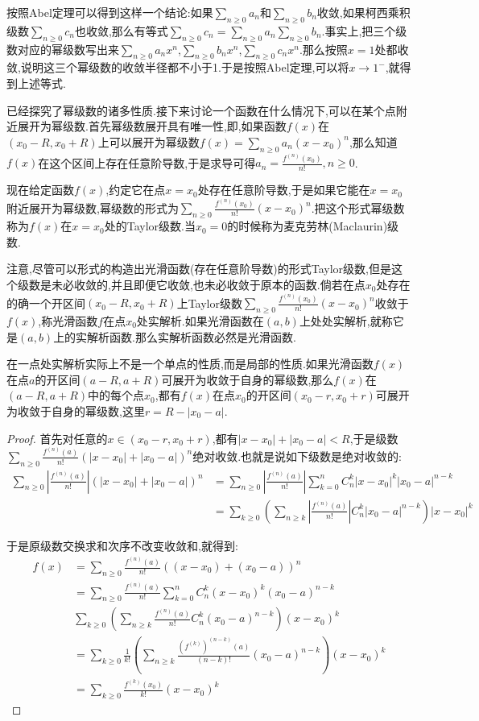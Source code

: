按照Abel定理可以得到这样一个结论:如果$\sum_{n\ge0}a_n$和$\sum_{n\ge0}b_n$收敛,如果柯西乘积级数$\sum_{n\ge0}c_n$也收敛,那么有等式$\sum_{n\ge0}c_n=\sum_{n\ge0}a_n\sum_{n\ge0}b_n$.事实上,把三个级数对应的幂级数写出来$\sum_{n\ge0}a_nx^n$,$\sum_{n\ge0}b_nx^n$,$\sum_{n\ge0}c_nx^n$.那么按照$x=1$处都收敛,说明这三个幂级数的收敛半径都不小于1.于是按照Abel定理,可以将$x\to1^-$,就得到上述等式.

已经探究了幂级数的诸多性质.接下来讨论一个函数在什么情况下,可以在某个点附近展开为幂级数.首先幂级数展开具有唯一性,即,如果函数$f(x)$在$(x_0-R,x_0+R)$上可以展开为幂级数$f(x)=\sum_{n\ge0}a_n(x-x_0)^n$,那么知道$f(x)$在这个区间上存在任意阶导数,于是求导可得$a_n=\frac{f^{(n)}(x_0)}{n!},n\ge0$.

现在给定函数$f(x)$,约定它在点$x=x_0$处存在任意阶导数,于是如果它能在$x=x_0$附近展开为幂级数,幂级数的形式为$\sum_{n\ge0}\frac{f^{(n)}(x_0)}{n!}(x-x_0)^n$.把这个形式幂级数称为$f(x)$在$x=x_0$处的Taylor级数.当$x_0=0$的时候称为麦克劳林(Maclaurin)级数.

注意,尽管可以形式的构造出光滑函数(存在任意阶导数)的形式Taylor级数,但是这个级数是未必收敛的,并且即便它收敛,也未必收敛于原本的函数.倘若在点$x_0$处存在的确一个开区间$(x_0-R,x_0+R)$上Taylor级数$\sum_{n\ge0}\frac{f^{(n)}(x_0)}{n!}(x-x_0)^n$收敛于$f(x)$,称光滑函数$f$在点$x_0$处实解析.如果光滑函数在$(a,b)$上处处实解析,就称它是$(a,b)$上的实解析函数.那么实解析函数必然是光滑函数.

在一点处实解析实际上不是一个单点的性质,而是局部的性质.如果光滑函数$f(x)$在点$a$的开区间$(a-R,a+R)$可展开为收敛于自身的幂级数,那么$f(x)$在$(a-R,a+R)$中的每个点$x_0$,都有$f(x)$在点$x_0$的开区间$(x_0-r,x_0+r)$可展开为收敛于自身的幂级数,这里$r=R-|x_0-a|$.
\begin{proof}
	
	首先对任意的$x\in(x_0-r,x_0+r)$,都有$|x-x_0|+|x_0-a|<R$,于是级数$\sum_{n\ge0}\frac{f^{(n)}(a)}{n!}\left(|x-x_0|+|x_0-a|\right)^n$绝对收敛.也就是说如下级数是绝对收敛的:
	\begin{align*}
	\sum_{n\ge0}\left|\frac{f^{(n)}(a)}{n!}\right|\left(|x-x_0|+|x_0-a|\right)^n &=\sum_{n\ge0}\left|\frac{f^{(n)}(a)}{n!}\right|\sum_{k=0}^{n}C_n^k|x-x_0|^k|x_0-a|^{n-k} \\
	&=\sum_{k\ge0}\left(\sum_{n\ge k}\left|\frac{f^{(n)}(a)}{n!}\right|C_n^k|x_0-a|^{n-k}\right)|x-x_0|^k
	\end{align*}
	
	于是原级数交换求和次序不改变收敛和,就得到:
	\begin{align*}
	f(x)&=\sum_{n\ge0}\frac{f^{(n)}(a)}{n!}\left((x-x_0)+(x_0-a)\right)^n \\
	&=\sum_{n\ge0}\frac{f^{(n)}(a)}{n!}\sum_{k=0}^nC_n^k(x-x_0)^k(x_0-a)^{n-k} \\
	&\sum_{k\ge0}\left(\sum_{n\ge k}\frac{f^{(n)}(a)}{n!}C_n^k(x_0-a)^{n-k}\right)(x-x_0)^k \\
	&=\sum_{k\ge0}\frac{1}{k!}\left(\sum_{n\ge k}\frac{(f^{(k)})^{(n-k)}(a)}{(n-k)!}(x_0-a)^{n-k}\right)(x-x_0)^k \\
	&=\sum_{k\ge0}\frac{f^{(k)}(x_0)}{k!}(x-x_0)^k
	\end{align*}
\end{proof}

